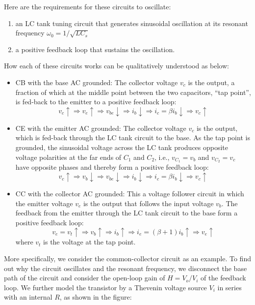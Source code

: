 \begin{itemize}
Here are the requirements for these circuits to oscillate:
\begin{enumerate}
\item an LC tank tuning circuit that generates sinusoidal oscillation 
  at its resonant frequency $\omega_0=1/\sqrt{LC_s}$
\item a positive feedback loop that sustains the oscillation.
\end{enumerate}
How each of these circuits works can be qualitatively understood as 
below:
\begin{itemize}
\item CB with the base AC grounded: The collector voltage $v_c$ is the 
  output, a fraction of which at the middle point between the two 
  capacitors, ``tap point'', is fed-back to the emitter to a positive 
  feedback loop:
  \[
  v_c\uparrow\Longrightarrow v_e\uparrow\Longrightarrow v_{be}\downarrow
  \Longrightarrow i_b\downarrow \Longrightarrow i_c=\beta i_b\downarrow
  \Longrightarrow v_c\uparrow
  \]
\item CE with the emitter AC grounded: The collector voltage $v_c$ is 
  the output, which is fed-back through the LC tank circuit to the base. 
  As the tap point is grounded, the sinusoidal voltage across the LC
  tank produces opposite voltage polarities at the far ends of $C_1$ 
  and $C_2$, i.e., $v_{C_1}=v_b$ and $v_{C_2}=v_c$ have opposite phases 
  and thereby form a positive feedback loop:  
  \[
  v_c\uparrow\Longrightarrow v_b\downarrow\Longrightarrow v_{be}\downarrow
  \Longrightarrow i_b\downarrow \Longrightarrow i_c=\beta i_b\downarrow
  \Longrightarrow v_c\uparrow
  \]
\item CC with the collector AC grounded: This a voltage follower circuit
  in which the emitter voltage $v_e$ is the output that follows the input
  voltage $v_b$. The feedback from the emitter through the LC tank circuit 
  to the base form a positive feedback loop:
  \[
  v_e=v_t\uparrow\Longrightarrow v_b\uparrow
  \Longrightarrow i_b\uparrow\Longrightarrow i_e=(\beta+1)i_b\uparrow
  \Longrightarrow v_e\uparrow
  \]
  where $v_t$ is the voltage at the tap point.

\end{itemize}

More specifically, we consider the common-collector circuit as an example.
To find out why the circuit oscillates and the resonant frequency, we 
disconnect the base path of the circuit and consider the open-loop gain 
of $H=V_o/V_i$ of the feedback loop. We further model the transistor 
by a Thevenin voltage source $V_i$ in series with an internal $R$, as 
shown in the figure:


\end{itemize}
